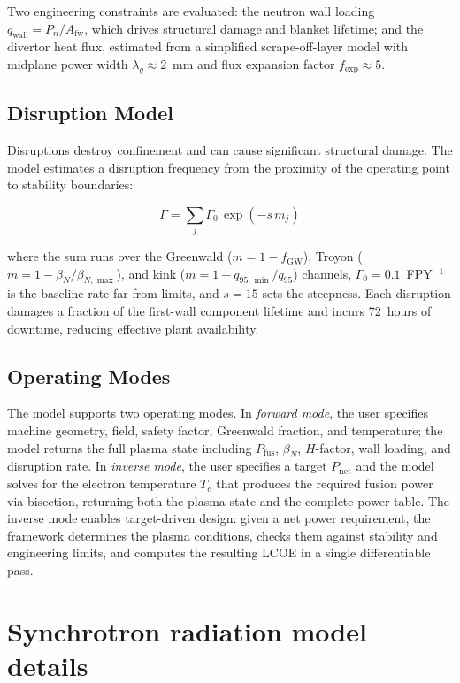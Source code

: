 \documentclass{article}
\begin{document}
Two engineering constraints are evaluated: the neutron wall loading
$q_{\text{wall}} = P_n / A_{\text{fw}}$, which drives structural
damage and blanket lifetime; and the divertor heat flux, estimated
from a simplified scrape-off-layer model with midplane power width
$\lambda_q \approx 2$~mm and flux expansion factor $f_{\text{exp}}
\approx 5$.

\subsection{Disruption Model}

Disruptions destroy confinement and can cause significant structural
damage. The model estimates a disruption frequency from the proximity
of the operating point to stability boundaries:

\begin{equation}
\label{eq:disruption-rate}
\Gamma = \sum_{j} \Gamma_0\,\exp\!\left(-s\,m_j\right)
\end{equation}

\noindent where the sum runs over the Greenwald ($m = 1 - f_{\text{GW}}$),
Troyon ($m = 1 - \beta_N/\beta_{N,\max}$), and kink
($m = 1 - q_{95,\min}/q_{95}$) channels, $\Gamma_0 = 0.1$~FPY$^{-1}$
is the baseline rate far from limits, and $s = 15$ sets the
steepness. Each disruption damages a fraction of the first-wall
component lifetime and incurs 72~hours of downtime, reducing
effective plant availability.

\subsection{Operating Modes}

The model supports two operating modes. In \emph{forward mode}, the
user specifies machine geometry, field, safety factor, Greenwald
fraction, and temperature; the model returns the full plasma state
including $P_{\text{fus}}$, $\beta_N$, $H$-factor, wall loading,
and disruption rate. In \emph{inverse mode}, the user specifies a
target $P_{\text{net}}$ and the model solves for the electron
temperature $T_e$ that produces the required fusion power via
bisection, returning both the plasma state and the complete power
table. The inverse mode enables target-driven design: given a net
power requirement, the framework determines the plasma conditions,
checks them against stability and engineering limits, and computes
the resulting LCOE in a single differentiable pass.


\section{Synchrotron radiation model details}
\label{app:synchrotron}
\end{document}
